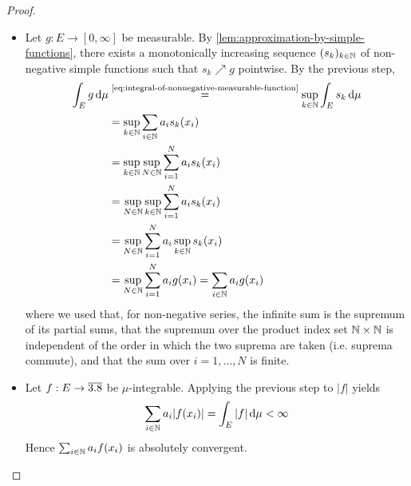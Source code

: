 \begin{proof}
\begin{itemize}[leftmargin=2.0em, labelsep=.5em]
\item[\ref{step:integral-of-nonnegative-measurable-function}.]
Let $g:E\to[0,\infty]$ be measurable.
By \autoref{lem:approximation-by-simple-functions}, there exists a monotonically increasing sequence $(s_k)_{k\in\mathbb{N}}$ of non-negative simple functions such that $s_k\nearrow g$ pointwise.
By the previous step,
\[
\begin{aligned}
\int_E g\,\mathrm{d}\mu
&\overset{\text{\eqref{eq:integral-of-nonnegative-measurable-function}}}{=}
\sup_{k\in\mathbb{N}}\int_E s_k\,\mathrm{d}\mu
\\
&=
\sup_{k\in\mathbb{N}}\sum_{i\in\mathbb{N}} a_i s_k(x_i)
\\
&=
\sup_{k\in\mathbb{N}}\sup_{N\in\mathbb{N}}\sum_{i=1}^N a_i s_k(x_i)
\\
&=
\sup_{N\in\mathbb{N}}\sup_{k\in\mathbb{N}}\sum_{i=1}^N a_i s_k(x_i)
\\
&=
\sup_{N\in\mathbb{N}}\sum_{i=1}^N a_i \sup_{k\in\mathbb{N}} s_k(x_i)
\\
&=
\sup_{N\in\mathbb{N}}\sum_{i=1}^N a_i g(x_i)
=
\sum_{i\in\mathbb{N}} a_i g(x_i)
\end{aligned}
\]
where we used that, for non-negative series, the infinite sum is the supremum of its partial sums, that the supremum over the product index set $\mathbb{N}\times\mathbb{N}$ is independent of the order in which the two suprema are taken (i.e. suprema commute), and that the sum over $i=1,\ldots,N$ is finite.

\item[\ref{step:integral-of-integrable-function}.]
Let $f:E\to\overline{3.8}$ be $\mu$-integrable.
Applying the previous step to $|f|$ yields
\[
\sum_{i\in\mathbb{N}} a_i |f(x_i)|
=
\int_E |f|\,\mathrm{d}\mu
<
\infty
\]
Hence $\sum_{i\in\mathbb{N}} a_i f(x_i)$ is absolutely convergent.


\end{itemize}
\end{proof}
